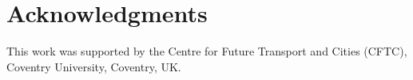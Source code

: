 \documentclass[12pt,lettersize,journal,onecolumn]{IEEEtran}
\begin{document}
\section*{Acknowledgments}
This work was supported by the Centre for Future Transport and Cities (CFTC), Coventry University, Coventry, UK. %

 
{}




\end{document}
